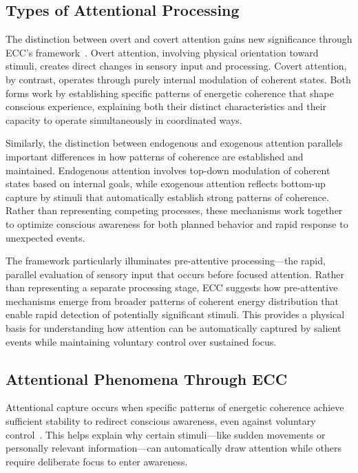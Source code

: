 \subsection*{Types of Attentional Processing}

The distinction between overt and covert attention gains new significance through ECC's framework~\cite{hunt2024electromagnetic}. Overt attention, involving physical orientation toward stimuli, creates direct changes in sensory input and processing. Covert attention, by contrast, operates through purely internal modulation of coherent states. Both forms work by establishing specific patterns of energetic coherence that shape conscious experience, explaining both their distinct characteristics and their capacity to operate simultaneously in coordinated ways.

Similarly, the distinction between endogenous and exogenous attention parallels important differences in how patterns of coherence are established and maintained. Endogenous attention involves top-down modulation of coherent states based on internal goals, while exogenous attention reflects bottom-up capture by stimuli that automatically establish strong patterns of coherence. Rather than representing competing processes, these mechanisms work together to optimize conscious awareness for both planned behavior and rapid response to unexpected events.

The framework particularly illuminates pre-attentive processing—the rapid, parallel evaluation of sensory input that occurs before focused attention. Rather than representing a separate processing stage, ECC suggests how pre-attentive mechanisms emerge from broader patterns of coherent energy distribution that enable rapid detection of potentially significant stimuli. This provides a physical basis for understanding how attention can be automatically captured by salient events while maintaining voluntary control over sustained focus.

\subsection*{Attentional Phenomena Through ECC}

Attentional capture occurs when specific patterns of energetic coherence achieve sufficient stability to redirect conscious awareness, even against voluntary control~\cite{block1995confusion}. This helps explain why certain stimuli—like sudden movements or personally relevant information—can automatically draw attention while others require deliberate focus to enter awareness.

